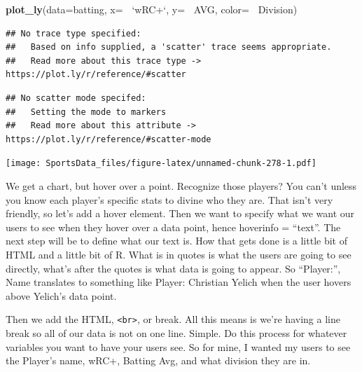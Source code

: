 \documentclass[]{book}
\newenvironment{Shaded}{\begin{snugshade}}{\end{snugshade}}
\newcommand{\DataTypeTok}[1]{\textcolor[rgb]{0.13,0.29,0.53}{#1}}
\newcommand{\KeywordTok}[1]{\textcolor[rgb]{0.13,0.29,0.53}{\textbf{#1}}}
\newcommand{\NormalTok}[1]{#1}
\newcommand{\OperatorTok}[1]{\textcolor[rgb]{0.81,0.36,0.00}{\textbf{#1}}}
\newcommand{\StringTok}[1]{\textcolor[rgb]{0.31,0.60,0.02}{#1}}
\begin{document}
\begin{Shaded}
\begin{Highlighting}[]
\KeywordTok{plot_ly}\NormalTok{(}\DataTypeTok{data=}\NormalTok{batting, }\DataTypeTok{x=} \OperatorTok{~}\StringTok{`}\DataTypeTok{wRC+}\StringTok{`}\NormalTok{, }\DataTypeTok{y=} \OperatorTok{~}\NormalTok{AVG, }\DataTypeTok{color=} \OperatorTok{~}\NormalTok{Division)}
\end{Highlighting}
\end{Shaded}

\begin{verbatim}
## No trace type specified:
##   Based on info supplied, a 'scatter' trace seems appropriate.
##   Read more about this trace type -> https://plot.ly/r/reference/#scatter
\end{verbatim}

\begin{verbatim}
## No scatter mode specifed:
##   Setting the mode to markers
##   Read more about this attribute -> https://plot.ly/r/reference/#scatter-mode
\end{verbatim}

\texttt{[image: SportsData\_files/figure-latex/unnamed-chunk-278-1.pdf]}

We get a chart, but hover over a point. Recognize those players? You can't unless you know each player's specific stats to divine who they are. That isn't very friendly, so let's add a hover element. Then we want to specify what we want our users to see when they hover over a data point, hence hoverinfo = ``text''. The next step will be to define what our text is. How that gets done is a little bit of HTML and a little bit of R. What is in quotes is what the users are going to see directly, what's after the quotes is what data is going to appear. So ``Player:'', Name translates to something like Player: Christian Yelich when the user hovers above Yelich's data point.

Then we add the HTML, \texttt{\textless{}br\textgreater{}}, or break. All this means is we're having a line break so all of our data is not on one line. Simple. Do this process for whatever variables you want to have your users see. So for mine, I wanted my users to see the Player's name, wRC+, Batting Avg, and what division they are in.
\end{document}
